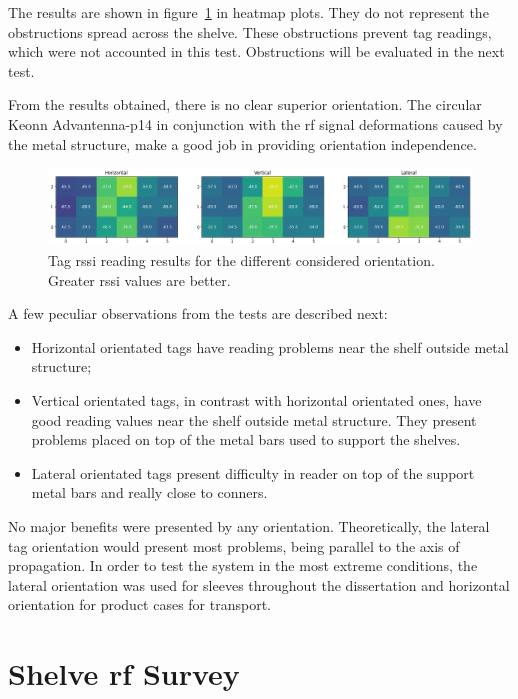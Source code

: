 The results are shown in figure~\ref{fig:tagorientationsresults} in heatmap plots.
They do not represent the obstructions spread across the shelve. These obstructions prevent tag readings, which were not accounted in this test. Obstructions will be evaluated in the next test.

From the results obtained, there is no clear superior orientation. The circular Keonn Advantenna-p14 in conjunction with the \ac{rf} signal deformations caused by the metal structure, make a good job in providing orientation independence.

\begin{figure}
    \centering
    \includegraphics[width=\textwidth]{figs/tests/RSSI_shelve1.png}
    \caption{Tag \ac{rssi} reading results for the different considered orientation. Greater \ac{rssi} values are better.}
    \label{fig:tagorientationsresults}
\end{figure}

A few peculiar observations from the tests are described next:

\begin{itemize}
    \item Horizontal orientated tags have reading problems near the shelf outside metal structure;
    \item Vertical orientated tags, in contrast with horizontal orientated ones, have good reading values near the shelf outside metal structure. They present problems placed on top of the metal bars used to support the shelves.
    \item Lateral orientated tags present difficulty in reader on top of the support metal bars and really close to conners.
\end{itemize}

No major benefits were presented by any orientation.
Theoretically, the lateral tag orientation would present most problems, being parallel to the axis of propagation.
In order to test the system in the most extreme conditions, the lateral orientation was used for sleeves throughout the dissertation and horizontal orientation for product cases for transport.

\section{Shelve \acs{rf} Survey}

